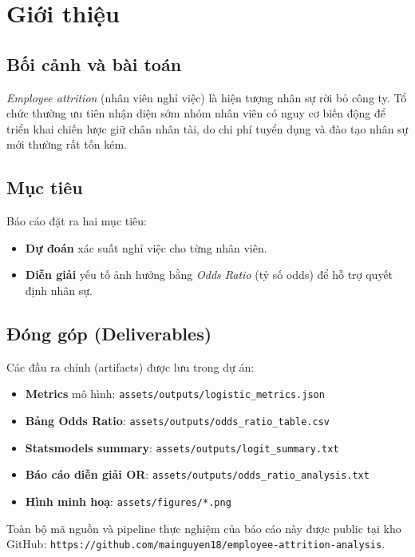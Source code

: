 \chapter{Giới thiệu}

\section{Bối cảnh và bài toán}
\textit{Employee attrition} (nhân viên nghỉ việc) là hiện tượng nhân sự rời bỏ công ty. Tổ chức thường ưu tiên nhận diện sớm nhóm nhân viên có nguy cơ biến động để triển khai chiến lược giữ chân nhân tài, do chi phí tuyển dụng và đào tạo nhân sự mới thường rất tốn kém.

\section{Mục tiêu}
Báo cáo đặt ra hai mục tiêu:
\begin{itemize}
  \item \textbf{Dự đoán} xác suất nghỉ việc cho từng nhân viên.
  \item \textbf{Diễn giải} yếu tố ảnh hưởng bằng \textit{Odds Ratio} (tỷ số odds) để hỗ trợ quyết định nhân sự.
\end{itemize}

\section{Đóng góp (Deliverables)}
Các đầu ra chính (artifacts) được lưu trong dự án:
\begin{itemize}
  \item \textbf{Metrics} mô hình: \texttt{assets/outputs/logistic\_metrics.json}
  \item \textbf{Bảng Odds Ratio}: \texttt{assets/outputs/odds\_ratio\_table.csv}
  \item \textbf{Statsmodels summary}: \texttt{assets/outputs/logit\_summary.txt}
  \item \textbf{Báo cáo diễn giải OR}: \texttt{assets/outputs/odds\_ratio\_analysis.txt}
  \item \textbf{Hình minh hoạ}: \texttt{assets/figures/*.png}
\end{itemize}

Toàn bộ mã nguồn và pipeline thực nghiệm của báo cáo này được public tại kho GitHub:
\texttt{https://github.com/mainguyen18/employee-attrition-analysis}.


